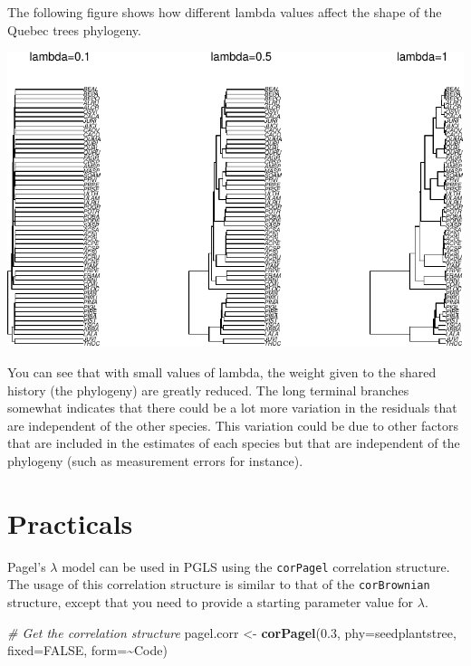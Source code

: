 \documentclass[
]{book}
\newenvironment{Shaded}{\begin{snugshade}}{\end{snugshade}}
\newcommand{\AttributeTok}[1]{\textcolor[rgb]{0.13,0.29,0.53}{#1}}
\newcommand{\CommentTok}[1]{\textcolor[rgb]{0.56,0.35,0.01}{\textit{#1}}}
\newcommand{\ConstantTok}[1]{\textcolor[rgb]{0.56,0.35,0.01}{#1}}
\newcommand{\FloatTok}[1]{\textcolor[rgb]{0.00,0.00,0.81}{#1}}
\newcommand{\FunctionTok}[1]{\textcolor[rgb]{0.13,0.29,0.53}{\textbf{#1}}}
\newcommand{\NormalTok}[1]{#1}
\newcommand{\OtherTok}[1]{\textcolor[rgb]{0.56,0.35,0.01}{#1}}
\newcommand{\SpecialCharTok}[1]{\textcolor[rgb]{0.81,0.36,0.00}{\textbf{#1}}}
\begin{document}
The following figure shows how different lambda values affect the shape of the Quebec trees phylogeny.

\begin{center}\includegraphics{pcm-workshop_files/figure-latex/alpha example-1} \end{center}

You can see that with small values of lambda, the weight given to the shared history (the phylogeny) are greatly reduced. The long terminal branches somewhat indicates that there could be a lot more variation in the residuals that are independent of the other species. This variation could be due to other factors that are included in the estimates of each species but that are independent of the phylogeny (such as measurement errors for instance).

\section{Practicals}\label{practicals-1}

Pagel's \(\lambda\) model can be used in PGLS using the \texttt{corPagel} correlation structure. The usage of this correlation structure is similar to that of the \texttt{corBrownian} structure, except that you need to provide a starting parameter value for \(\lambda\).

\begin{Shaded}
\begin{Highlighting}[]
\CommentTok{\# Get the correlation structure}
\NormalTok{pagel.corr }\OtherTok{\textless{}{-}} \FunctionTok{corPagel}\NormalTok{(}\FloatTok{0.3}\NormalTok{, }\AttributeTok{phy=}\NormalTok{seedplantstree, }\AttributeTok{fixed=}\ConstantTok{FALSE}\NormalTok{, }\AttributeTok{form=}\SpecialCharTok{\textasciitilde{}}\NormalTok{Code)}
\end{Highlighting}
\end{Shaded}
\end{document}
